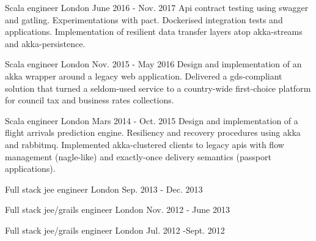 \begin{cventries}
  \cventry
    {Scala engineer} %
    {} %
    {London} %
    {June 2016 - Nov. 2017} %
    {} %
    {
{Api contract testing using swagger and gatling. Experimentations with pact. Dockerised integration tests and applications.}
{Implementation of resilient data transfer layers atop akka-streams and akka-persistence.}
    }

  \cventry
    {Scala engineer} %
    {} %
    {London} %
    {Nov. 2015 - May 2016} %
    {} %
    {
       {Design and implementation of an akka wrapper around a legacy web application.}
       {Delivered a gds-compliant solution that turned a seldom-used service to a country-wide first-choice platform for council tax and business rates collections.}
    }

  \cventry
    {Scala engineer} %
    {} %
    {London} %
    {Mars 2014 - Oct. 2015} %
    {} %
    {
 {Design and implementation of a flight arrivals prediction engine. Resiliency and recovery procedures using akka and rabbitmq.}
 {Implemented akka-clustered clients to legacy apis with flow management (nagle-like) and exactly-once delivery semantics (passport applications).}
    }

  \cventry
    {Full stack jee engineer} %
    {} %
    {London} %
    {Sep. 2013 - Dec. 2013} %
    {}
    {}

  \cventry
    {Full stack jee/grails engineer} %
    {} %
    {London} %
    {Nov. 2012 - June 2013} %
    {}
    {}

  \cventry
    {Full stack jee/grails engineer} %
    {} %
    {London} %
    {Jul. 2012 -Sept. 2012} %
    {}
    {}


\end{cventries}
